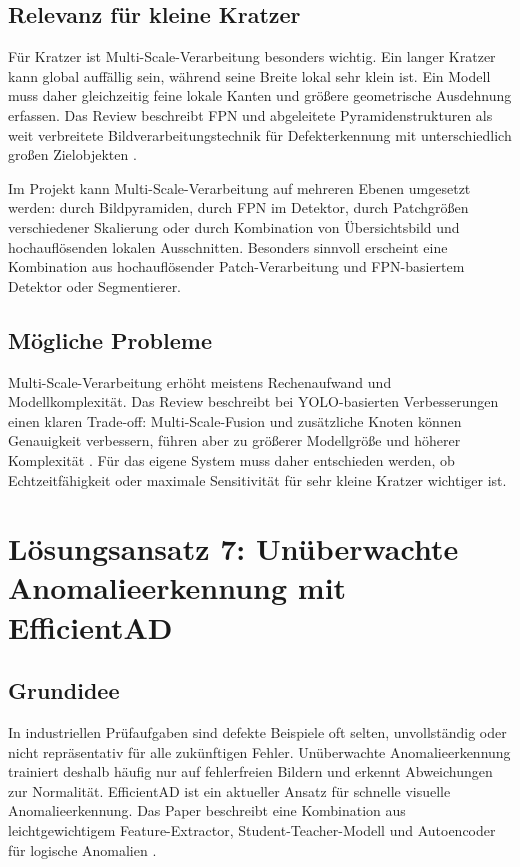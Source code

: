 \documentclass[11pt,a4paper]{article}
\begin{document}
\subsection{Relevanz für kleine Kratzer}

Für Kratzer ist Multi-Scale-Verarbeitung besonders wichtig. Ein langer Kratzer kann global auffällig sein, während seine Breite lokal sehr klein ist. Ein Modell muss daher gleichzeitig feine lokale Kanten und größere geometrische Ausdehnung erfassen. Das Review beschreibt FPN und abgeleitete Pyramidenstrukturen als weit verbreitete Bildverarbeitungstechnik für Defekterkennung mit unterschiedlich großen Zielobjekten \cite{applications_review}. 

Im Projekt kann Multi-Scale-Verarbeitung auf mehreren Ebenen umgesetzt werden: durch Bildpyramiden, durch FPN im Detektor, durch Patchgrößen verschiedener Skalierung oder durch Kombination von Übersichtsbild und hochauflösenden lokalen Ausschnitten. Besonders sinnvoll erscheint eine Kombination aus hochauflösender Patch-Verarbeitung und FPN-basiertem Detektor oder Segmentierer.

\subsection{Mögliche Probleme}

Multi-Scale-Verarbeitung erhöht meistens Rechenaufwand und Modellkomplexität. Das Review beschreibt bei YOLO-basierten Verbesserungen einen klaren Trade-off: Multi-Scale-Fusion und zusätzliche Knoten können Genauigkeit verbessern, führen aber zu größerer Modellgröße und höherer Komplexität \cite{applications_review}. Für das eigene System muss daher entschieden werden, ob Echtzeitfähigkeit oder maximale Sensitivität für sehr kleine Kratzer wichtiger ist.

\section{Lösungsansatz 7: Unüberwachte Anomalieerkennung mit EfficientAD}

\subsection{Grundidee}

In industriellen Prüfaufgaben sind defekte Beispiele oft selten, unvollständig oder nicht repräsentativ für alle zukünftigen Fehler. Unüberwachte Anomalieerkennung trainiert deshalb häufig nur auf fehlerfreien Bildern und erkennt Abweichungen zur Normalität. EfficientAD ist ein aktueller Ansatz für schnelle visuelle Anomalieerkennung. Das Paper beschreibt eine Kombination aus leichtgewichtigem Feature-Extractor, Student-Teacher-Modell und Autoencoder für logische Anomalien \cite{efficientad}. 
\end{document}
